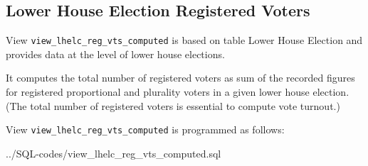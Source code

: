 \subsection{Lower House Election Registered Voters}\label{view_lhelc_reg_vts_computed}
View \texttt{\footnotesize view\_lhelc\_reg\_vts\_computed} is based on table Lower House Election and provides data at the level of lower house elections.

It computes the total number of registered voters as sum of the recorded figures for registered proportional and plurality voters in a given lower house election. (The total number of registered voters is essential to compute vote turnout.)

View \texttt{\footnotesize view\_lhelc\_reg\_vts\_computed} is programmed as follows:

%
{../SQL-codes/view_lhelc_reg_vts_computed.sql}


